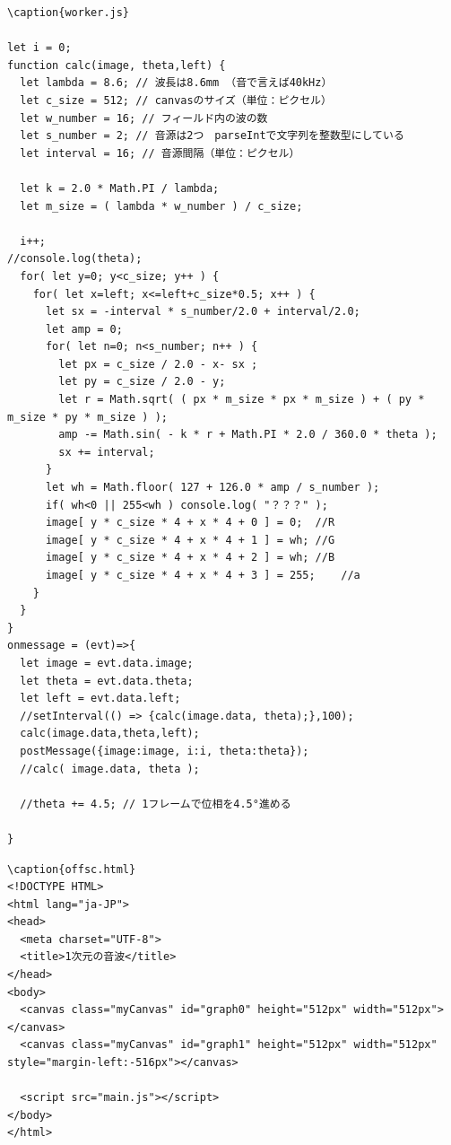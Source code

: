 \documentclass[a4j,12pt]{jsarticle}
\begin{document}
\begin{lstlisting}
\caption{worker.js}

let i = 0;
function calc(image, theta,left) {
  let lambda = 8.6; // 波長は8.6mm （音で言えば40kHz）
  let c_size = 512; // canvasのサイズ（単位：ピクセル）
  let w_number = 16; // フィールド内の波の数
  let s_number = 2; // 音源は2つ　parseIntで文字列を整数型にしている
  let interval = 16; // 音源間隔（単位：ピクセル）

  let k = 2.0 * Math.PI / lambda;
  let m_size = ( lambda * w_number ) / c_size;

  i++;
//console.log(theta);
  for( let y=0; y<c_size; y++ ) {
    for( let x=left; x<=left+c_size*0.5; x++ ) {
      let sx = -interval * s_number/2.0 + interval/2.0;
      let amp = 0;
      for( let n=0; n<s_number; n++ ) {
        let px = c_size / 2.0 - x- sx ;
        let py = c_size / 2.0 - y;
        let r = Math.sqrt( ( px * m_size * px * m_size ) + ( py * m_size * py * m_size ) );
        amp -= Math.sin( - k * r + Math.PI * 2.0 / 360.0 * theta );
        sx += interval;
      }
      let wh = Math.floor( 127 + 126.0 * amp / s_number );
      if( wh<0 || 255<wh ) console.log( "？？？" );
      image[ y * c_size * 4 + x * 4 + 0 ] = 0;  //R
      image[ y * c_size * 4 + x * 4 + 1 ] = wh; //G
      image[ y * c_size * 4 + x * 4 + 2 ] = wh; //B
      image[ y * c_size * 4 + x * 4 + 3 ] = 255;    //a
    }
  }
}
onmessage = (evt)=>{
  let image = evt.data.image;
  let theta = evt.data.theta;
  let left = evt.data.left;
  //setInterval(() => {calc(image.data, theta);},100);
  calc(image.data,theta,left);
  postMessage({image:image, i:i, theta:theta});
  //calc( image.data, theta );

  //theta += 4.5; // 1フレームで位相を4.5°進める

}

\end{lstlisting}
\newpage

\begin{lstlisting}
\caption{offsc.html}
<!DOCTYPE HTML>
<html lang="ja-JP">
<head>
  <meta charset="UTF-8">
  <title>1次元の音波</title>
</head>
<body>
  <canvas class="myCanvas" id="graph0" height="512px" width="512px"></canvas>
  <canvas class="myCanvas" id="graph1" height="512px" width="512px" style="margin-left:-516px"></canvas>

  <script src="main.js"></script>
</body>
</html>

\end{lstlisting}
\newpage
\end{document}
